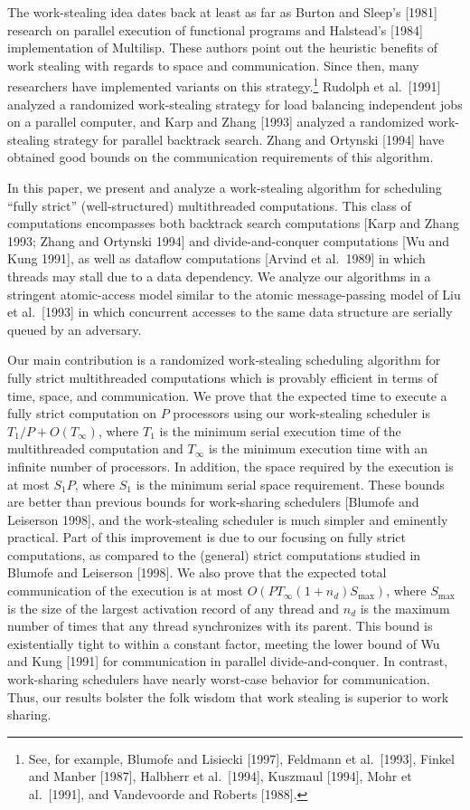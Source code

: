 \documentclass{article}
\begin{document}
The work-stealing idea dates back at least as far as Burton and Sleep's [1981] research on parallel execution of functional programs and Halstead's [1984] implementation of Multilisp. These authors point out the heuristic benefits of work stealing with regards to space and communication. Since then, many researchers have implemented variants on this strategy.\footnote{See, for example, Blumofe and Lisiecki [1997], Feldmann et al.\ [1993], Finkel and Manber [1987], Halbherr et al.\ [1994], Kuszmaul [1994], Mohr et al.\ [1991], and Vandevoorde and Roberts [1988].} Rudolph et al.\ [1991] analyzed a randomized work-stealing strategy for load balancing independent jobs on a parallel computer, and Karp and Zhang [1993] analyzed a randomized work-stealing strategy for parallel backtrack search. Zhang and Ortynski [1994] have obtained good bounds on the communication requirements of this algorithm.

In this paper, we present and analyze a work-stealing algorithm for scheduling ``fully strict'' (well-structured) multithreaded computations. This class of computations encompasses both backtrack search computations [Karp and Zhang 1993; Zhang and Ortynski 1994] and divide-and-conquer computations [Wu and Kung 1991], as well as dataflow computations [Arvind et al.\ 1989] in which threads may stall due to a data dependency. We analyze our algorithms in a stringent atomic-access model similar to the atomic message-passing model of Liu et al.\ [1993] in which concurrent accesses to the same data structure are serially queued by an adversary.

Our main contribution is a randomized work-stealing scheduling algorithm for fully strict multithreaded computations which is provably efficient in terms of time, space, and communication. We prove that the expected time to execute a fully strict computation on $P$ processors using our work-stealing scheduler is $T_1/P + O(T_\infty)$, where $T_1$ is the minimum serial execution time of the multithreaded computation and $T_\infty$ is the minimum execution time with an infinite number of processors. In addition, the space required by the execution is at most $S_1 P$, where $S_1$ is the minimum serial space requirement. These bounds are better than previous bounds for work-sharing schedulers [Blumofe and Leiserson 1998], and the work-stealing scheduler is much simpler and eminently practical. Part of this improvement is due to our focusing on fully strict computations, as compared to the (general) strict computations studied in Blumofe and Leiserson [1998]. We also prove that the expected total communication of the execution is at most $O(P T_\infty (1 + n_d) S_{\max})$, where $S_{\max}$ is the size of the largest activation record of any thread and $n_d$ is the maximum number of times that any thread synchronizes with its parent. This bound is existentially tight to within a constant factor, meeting the lower bound of Wu and Kung [1991] for communication in parallel divide-and-conquer. In contrast, work-sharing schedulers have nearly worst-case behavior for communication. Thus, our results bolster the folk wisdom that work stealing is superior to work sharing.
\end{document}

